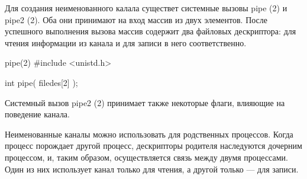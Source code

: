 Для создания неименованного калала существет системные вызовы pipe (2) и pipe2 (2). Оба они принимают на вход массив из двух элементов. После успешного выполнения вызова массив содержит два файловых дескриптора: для чтения информации из канала и для записи в него соответственно. 

\begin{CCode}{pipe(2)}
	#include <unistd.h>
	
	int pipe(
		filedes[2]
	); \end{CCode}

Системный вызов pipe2 (2) принимает также некоторые флаги, влияющие на поведение канала.

Неименованные каналы можно использовать для родственных процессов. Когда процесс порождает другой процесс, дескрипторы родителя наследуются дочерним процессом, и, таким образом, осуществляется связь между двумя процессами. Один из них использует канал только для чтения, а другой только --- для записи.